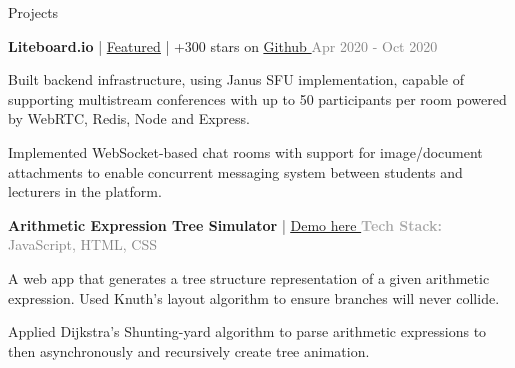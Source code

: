 \documentclass[hidelinks]{resume} %
\begin{document}
\begin{rSection}{Projects}
\vspace{-.1cm}
\begin{rSubsection}{\textbf{Liteboard.io} | \href{https://falauniversidades.com.br/projeto-gratuito-simplifica-o-acesso-as-aulas-on-line/}{\underline{Featured}} | +300 stars on \href{https://github.com/jeverd/lecture-experience}{\underline{Github} \faGithub}}{\textcolor{gray}{\small Apr 2020 - Oct 2020}}{}
        \par
        \begin{bulletpoints}
            \vspace{-.10cm}
            \item Built backend infrastructure, using Janus SFU implementation, capable of supporting multistream conferences with up to 50 participants per room powered by WebRTC, Redis, Node and Express.
             \vspace{-.13cm}
            \item Implemented WebSocket-based chat rooms with support for image/document attachments to enable concurrent messaging system between students and lecturers in the platform.
            \vspace{-.10cm}
        \end{bulletpoints}
\end{rSubsection}

\begin{rSubsection}{{\textbf{Arithmetic Expression Tree Simulator}} |
\href{https://lnogueir.github.io/expression-tree-gen/}{\underline{Demo here } \faGithub}}{\small \textcolor{darkgray}{\textbf{Tech Stack:} \textcolor{gray}{JavaScript, HTML, CSS}}}{}
\par
    \begin{bulletpoints}
    \vspace{-.10cm}
        \item A web app that generates a tree structure representation of a given arithmetic expression. Used Knuth's layout algorithm to ensure branches will never collide.
        \vspace{-.13cm}
        \item Applied Dijkstra's Shunting-yard algorithm to parse arithmetic expressions to then asynchronously and recursively create tree animation.
        \vspace{-.25cm}
    \end{bulletpoints}
\end{rSubsection}

\end{rSection}






\end{document}
